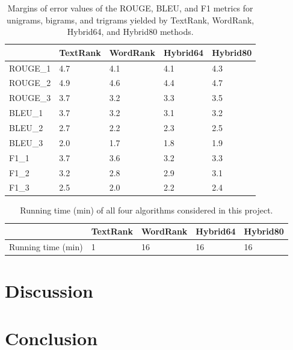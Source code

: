 \documentclass[11pt]{article}
\begin{document}
\begin{table}[!h]
\centering
\begin{tabular}{l|llll}
\hline
&\textbf{TextRank} & \textbf{WordRank} & \textbf{Hybrid64} & \textbf{Hybrid80} \\
\hline
ROUGE\_1 & 4.7 & 4.1 & 4.1 & 4.3\\
ROUGE\_2 & 4.9 & 4.6 & 4.4 & 4.7\\
ROUGE\_3 & 3.7 & 3.2 & 3.3 & 3.5\\
BLEU\_1 & 3.7 & 3.2 & 3.1 & 3.2\\
BLEU\_2 & 2.7 & 2.2 & 2.3 & 2.5\\
BLEU\_3 & 2.0 & 1.7 & 1.8 & 1.9\\
F1\_1 &  3.7 & 3.6 & 3.2 & 3.3\\
F1\_2 & 3.2 & 2.8 & 2.9 & 3.1\\
F1\_3  & 2.5 & 2.0 & 2.2 & 2.4\\
\hline
\end{tabular}
\caption{\label{tab:mors}
Margins of error values of the ROUGE, BLEU, and F1 metrics for unigrams, bigrams, and trigrams yielded by TextRank, WordRank, Hybrid64, and Hybrid80 methods.
}
\end{table}


\begin{table}[!h]
\centering
\begin{tabular}{l|llll}
\hline
&\textbf{TextRank} & \textbf{WordRank} & \textbf{Hybrid64} & \textbf{Hybrid80} \\
\hline
Running time (min) & 1 & 16 & 16 & 16\\
\hline
\end{tabular}
\caption{\label{tab:time}
Running time (min) of all four algorithms considered in this project.
}
\end{table}


\section{Discussion}

\section{Conclusion}
\end{document}
